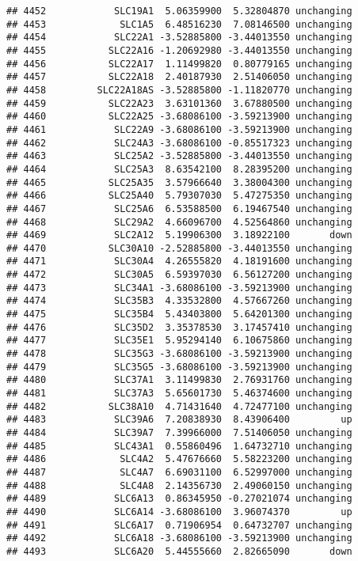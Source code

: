 \documentclass[]{article}
\begin{document}
\begin{verbatim}
## 4452            SLC19A1  5.06359900  5.32804870 unchanging
## 4453             SLC1A5  6.48516230  7.08146500 unchanging
## 4454            SLC22A1 -3.52885800 -3.44013550 unchanging
## 4455           SLC22A16 -1.20692980 -3.44013550 unchanging
## 4456           SLC22A17  1.11499820  0.80779165 unchanging
## 4457           SLC22A18  2.40187930  2.51406050 unchanging
## 4458         SLC22A18AS -3.52885800 -1.11820770 unchanging
## 4459           SLC22A23  3.63101360  3.67880500 unchanging
## 4460           SLC22A25 -3.68086100 -3.59213900 unchanging
## 4461            SLC22A9 -3.68086100 -3.59213900 unchanging
## 4462            SLC24A3 -3.68086100 -0.85517323 unchanging
## 4463            SLC25A2 -3.52885800 -3.44013550 unchanging
## 4464            SLC25A3  8.63542100  8.28395200 unchanging
## 4465           SLC25A35  3.57966640  3.38004300 unchanging
## 4466           SLC25A40  5.79307030  5.47275350 unchanging
## 4467            SLC25A6  6.53588500  6.19467540 unchanging
## 4468            SLC29A2  4.66096700  4.52564860 unchanging
## 4469            SLC2A12  5.19906300  3.18922100       down
## 4470           SLC30A10 -2.52885800 -3.44013550 unchanging
## 4471            SLC30A4  4.26555820  4.18191600 unchanging
## 4472            SLC30A5  6.59397030  6.56127200 unchanging
## 4473            SLC34A1 -3.68086100 -3.59213900 unchanging
## 4474            SLC35B3  4.33532800  4.57667260 unchanging
## 4475            SLC35B4  5.43403800  5.64201300 unchanging
## 4476            SLC35D2  3.35378530  3.17457410 unchanging
## 4477            SLC35E1  5.95294140  6.10675860 unchanging
## 4478            SLC35G3 -3.68086100 -3.59213900 unchanging
## 4479            SLC35G5 -3.68086100 -3.59213900 unchanging
## 4480            SLC37A1  3.11499830  2.76931760 unchanging
## 4481            SLC37A3  5.65601730  5.46374600 unchanging
## 4482           SLC38A10  4.71431640  4.72477100 unchanging
## 4483            SLC39A6  7.20838930  8.43906400         up
## 4484            SLC39A7  7.39966000  7.51406050 unchanging
## 4485            SLC43A1  0.55860496  1.64732710 unchanging
## 4486             SLC4A2  5.47676660  5.58223200 unchanging
## 4487             SLC4A7  6.69031100  6.52997000 unchanging
## 4488             SLC4A8  2.14356730  2.49060150 unchanging
## 4489            SLC6A13  0.86345950 -0.27021074 unchanging
## 4490            SLC6A14 -3.68086100  3.96074370         up
## 4491            SLC6A17  0.71906954  0.64732707 unchanging
## 4492            SLC6A18 -3.68086100 -3.59213900 unchanging
## 4493            SLC6A20  5.44555660  2.82665090       down

\end{verbatim}
\end{document}
